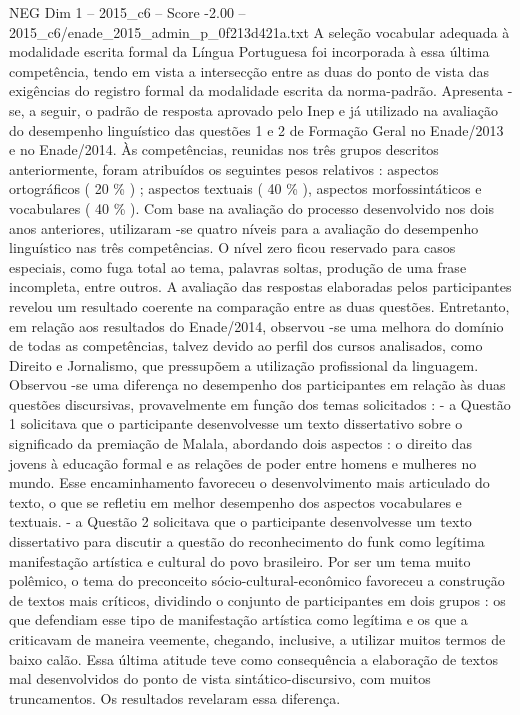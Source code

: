 \begin{textsample}{NEG Dim 1 – 2015\_c6 – Score -2.00 – 2015\_c6/enade\_2015\_admin\_p\_0f213d421a.txt}
A seleção vocabular adequada à modalidade escrita formal da Língua Portuguesa foi incorporada à essa última competência, tendo em vista a intersecção entre as duas do ponto de vista das exigências do registro formal da modalidade escrita da norma-padrão.
Apresenta -se, a seguir, o padrão de resposta aprovado pelo Inep e já utilizado na avaliação do desempenho linguístico das questões 1 e 2 de Formação Geral no Enade/2013 e no Enade/2014.
Às competências, reunidas nos três grupos descritos anteriormente, foram atribuídos os seguintes pesos relativos : aspectos ortográficos ( 20 \% ) ; aspectos textuais ( 40 \% ), aspectos morfossintáticos e vocabulares ( 40 \% ).
Com base na avaliação do processo desenvolvido nos dois anos anteriores, utilizaram -se quatro níveis para a avaliação do desempenho linguístico nas três competências.
O nível zero ficou reservado para casos especiais, como fuga total ao tema, palavras soltas, produção de uma frase incompleta, entre outros.
A avaliação das respostas elaboradas pelos participantes revelou um resultado coerente na comparação entre as duas questões.
Entretanto, em relação aos resultados do Enade/2014, observou -se uma melhora do domínio de todas as competências, talvez devido ao perfil dos cursos analisados, como Direito e Jornalismo, que pressupõem a utilização profissional da linguagem.
Observou -se uma diferença no desempenho dos participantes em relação às duas questões discursivas, provavelmente em função dos temas solicitados : - a Questão 1 solicitava que o participante desenvolvesse um texto dissertativo sobre o significado da premiação de Malala, abordando dois aspectos : o direito das jovens à educação formal e as relações de poder entre homens e mulheres no mundo.
Esse encaminhamento favoreceu o desenvolvimento mais articulado do texto, o que se refletiu em melhor desempenho dos aspectos vocabulares e textuais. - a Questão 2 solicitava que o participante desenvolvesse um texto dissertativo para discutir a questão do reconhecimento do funk como legítima manifestação artística e cultural do povo brasileiro.
Por ser um tema muito polêmico, o tema do preconceito sócio-cultural-econômico favoreceu a construção de textos mais críticos, dividindo o conjunto de participantes em dois grupos : os que defendiam esse tipo de manifestação artística como legítima e os que a criticavam de maneira veemente, chegando, inclusive, a utilizar muitos termos de baixo calão.
Essa última atitude teve como consequência a elaboração de textos mal desenvolvidos do ponto de vista sintático-discursivo, com muitos truncamentos.
Os resultados revelaram essa diferença.

\end{textsample}
